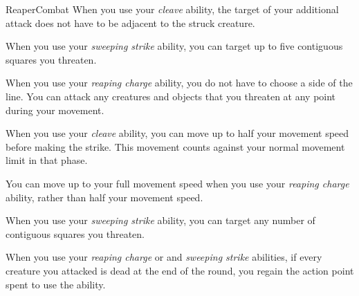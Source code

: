 \begin{feat}{Reaper}{Combat}
         When you use your \textit{cleave} ability, the target of your additional attack does not have to be adjacent to the struck creature.

         When you use your \textit{sweeping strike} ability, you can target up to five contiguous squares you threaten.

         When you use your \textit{reaping charge} ability, you do not have to choose a side of the line.
        You can attack any creatures and objects that you threaten at any point during your movement.

         When you use your \textit{cleave} ability, you can move up to half your movement speed before making the strike.
        This movement counts against your normal movement limit in that phase.

         You can move up to your full movement speed when you use your \textit{reaping charge} ability, rather than half your movement speed.

         When you use your \textit{sweeping strike} ability, you can target any number of contiguous squares you threaten.

         When you use your \textit{reaping charge} or and \textit{sweeping strike} abilities, if every creature you attacked is dead at the end of the round, you regain the action point spent to use the ability.

    \end{feat}

